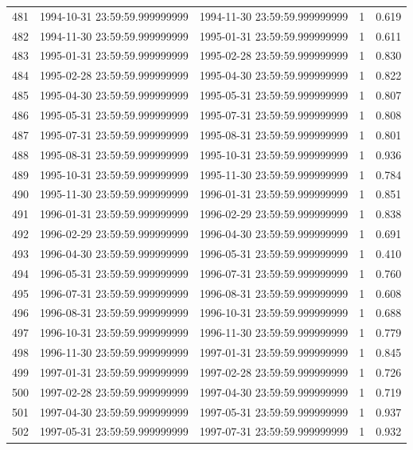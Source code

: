 \begin{table}
\begin{tabular}{lcccc}
481 & 1994-10-31 23:59:59.999999999 & 1994-11-30 23:59:59.999999999 & 1 & 0.619 \\
482 & 1994-11-30 23:59:59.999999999 & 1995-01-31 23:59:59.999999999 & 1 & 0.611 \\
483 & 1995-01-31 23:59:59.999999999 & 1995-02-28 23:59:59.999999999 & 1 & 0.830 \\
484 & 1995-02-28 23:59:59.999999999 & 1995-04-30 23:59:59.999999999 & 1 & 0.822 \\
485 & 1995-04-30 23:59:59.999999999 & 1995-05-31 23:59:59.999999999 & 1 & 0.807 \\
486 & 1995-05-31 23:59:59.999999999 & 1995-07-31 23:59:59.999999999 & 1 & 0.808 \\
487 & 1995-07-31 23:59:59.999999999 & 1995-08-31 23:59:59.999999999 & 1 & 0.801 \\
488 & 1995-08-31 23:59:59.999999999 & 1995-10-31 23:59:59.999999999 & 1 & 0.936 \\
489 & 1995-10-31 23:59:59.999999999 & 1995-11-30 23:59:59.999999999 & 1 & 0.784 \\
490 & 1995-11-30 23:59:59.999999999 & 1996-01-31 23:59:59.999999999 & 1 & 0.851 \\
491 & 1996-01-31 23:59:59.999999999 & 1996-02-29 23:59:59.999999999 & 1 & 0.838 \\
492 & 1996-02-29 23:59:59.999999999 & 1996-04-30 23:59:59.999999999 & 1 & 0.691 \\
493 & 1996-04-30 23:59:59.999999999 & 1996-05-31 23:59:59.999999999 & 1 & 0.410 \\
494 & 1996-05-31 23:59:59.999999999 & 1996-07-31 23:59:59.999999999 & 1 & 0.760 \\
495 & 1996-07-31 23:59:59.999999999 & 1996-08-31 23:59:59.999999999 & 1 & 0.608 \\
496 & 1996-08-31 23:59:59.999999999 & 1996-10-31 23:59:59.999999999 & 1 & 0.688 \\
497 & 1996-10-31 23:59:59.999999999 & 1996-11-30 23:59:59.999999999 & 1 & 0.779 \\
498 & 1996-11-30 23:59:59.999999999 & 1997-01-31 23:59:59.999999999 & 1 & 0.845 \\
499 & 1997-01-31 23:59:59.999999999 & 1997-02-28 23:59:59.999999999 & 1 & 0.726 \\
500 & 1997-02-28 23:59:59.999999999 & 1997-04-30 23:59:59.999999999 & 1 & 0.719 \\
501 & 1997-04-30 23:59:59.999999999 & 1997-05-31 23:59:59.999999999 & 1 & 0.937 \\
502 & 1997-05-31 23:59:59.999999999 & 1997-07-31 23:59:59.999999999 & 1 & 0.932 \\

\end{tabular}
\end{table}
